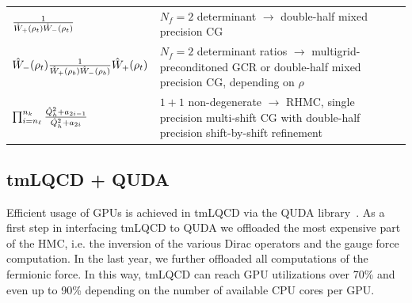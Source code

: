 \documentclass[a0,portrait]{a0poster}
\begin{document}
\begin{multicols}{2}
    \begin{tabular}{p{0.3\linewidth}p{0.7\linewidth}}
      \centering $\frac{1}{\hat{W}_{+}(\rho_t) \hat{W}_{-}(\rho_t)}$ & $N_f=2$ determinant $\rightarrow$ double-half mixed precision CG \\[1cm]
    \centering $\hat{W}_{-}(\rho_t) \frac{1}{\hat{W}_{+}(\rho_b) \hat{W}_{-}(\rho_b)} \hat{W}_{+}(\rho_t)$ & $N_f=2$ determinant ratios $\rightarrow$ multigrid-preconditoned GCR or double-half mixed precision CG, depending on $\rho$ \\
    \centering $\prod_{i=n_\ell}^{n_k} \frac{ \hat{Q}^2_h + a_{2i-1} }{ \hat{Q}^2_h + a_{2i} }$ & $1+1$ non-degenerate $\rightarrow$ RHMC, single precision multi-shift CG with double-half precision shift-by-shift refinement
    \end{tabular}

    \subsection*{tmLQCD + QUDA}

    Efficient usage of GPUs is achieved in tmLQCD via the QUDA library~\cite{Clark:2009wm,Babich:2011np}. As a first step in interfacing tmLQCD to QUDA \cite{Kostrzewa:2022hsv}
    we offloaded the most expensive part of the HMC, i.e. the inversion of the various Dirac operators and the gauge force computation. In the last year, we further offloaded all computations of the fermionic force. In this way, tmLQCD can reach GPU utilizations over 70\% and even up to 90\% depending on the number of available CPU cores per GPU.


\end{multicols}
\end{document}

